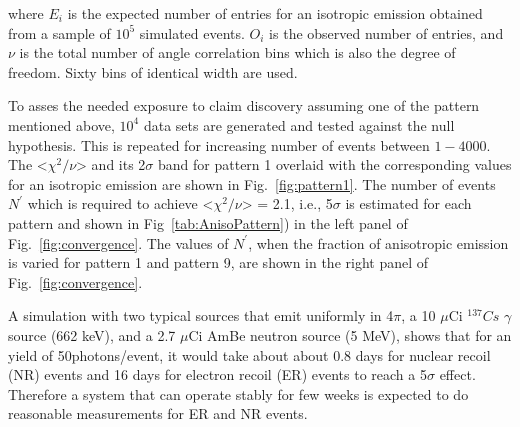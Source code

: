 where $E_i$ is the expected number of entries for an isotropic emission obtained from a sample of $10^5$ simulated events. 
$O_i$ is the observed number of entries, and $\nu$ is the total number of angle correlation bins 
which is also the degree of freedom. Sixty bins of identical width are used.



%
%






To asses the needed exposure to claim discovery assuming one of the   pattern mentioned above, $10^4$ data sets are generated and tested against the null hypothesis. This is repeated for increasing number of events between $1-4000$. The <$\chi^2/\nu$> 
and its 2$\sigma$ band for pattern 1 overlaid with the corresponding values 
for an isotropic emission are shown in Fig.~\ref{fig:pattern1}.  The number of events 
$N^{'}$ which is required to achieve <$\chi^2/\nu$> = 2.1, i.e., 5$\sigma$ is estimated for each pattern and shown in Fig~\ref{tab:AnisoPattern}) in the left panel of Fig.~\ref{fig:convergence}. The values of $N^{'}$, when the fraction of anisotropic 
emission is varied for pattern 1 and pattern 9, are shown in the right panel of Fig.~\ref{fig:convergence}. 

A simulation with two typical sources that emit uniformly in 4$\pi$, a 10 $\mu$Ci $^{137}Cs$ $\gamma$ 
source (662 keV), and a 2.7 $\mu$Ci AmBe neutron source (5 MeV), shows that for an yield of 
50photons/event, it would take about about 0.8 days for 
nuclear recoil (NR) events and 16 days for electron recoil (ER) events to reach a 5$\sigma$ effect. 
Therefore a system that can operate stably for few weeks 
is expected to do reasonable measurements for ER and NR events.


